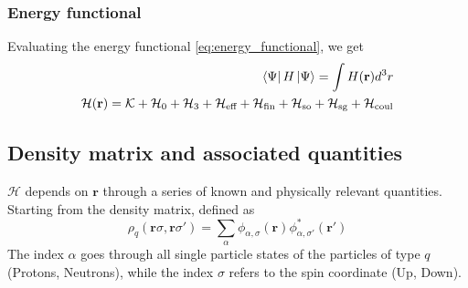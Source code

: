 \subsubsection{Energy functional}
Evaluating the energy functional \ref{eq:energy_functional}, we get
\begin{align}
    \bra{\Psi} H \ket{\Psi} = \int H(\mathbf{r}) d^3 r 
    \\\mathcal H(\mathbf{r}) = \mathcal{K} + \mathcal{H}_0 + \mathcal{H}_3 + \mathcal{H}_\text{eff}+\mathcal{H}_\text{fin}+\mathcal{H}_\text{so} + \mathcal{H}_\text{sg} + \mathcal{H}_\text{coul}
\end{align}
\subsection{Density matrix and associated quantities}
$\mathcal H$ depends on $\mathbf r$ through a series of known and physically relevant quantities.
\\Starting from the density matrix, defined as
\begin{equation}
    \rho_q (\mathbf r \sigma, \mathbf r \sigma') = \sum_{\alpha} \phi_{\alpha, \sigma} (\mathbf r )\phi_{\alpha, \sigma'}^*(\mathbf r')
\end{equation}
The index $\alpha$ goes through all single particle states of the particles of type $q$ (Protons, Neutrons), while the index $\sigma$ refers to the spin coordinate (Up, Down). 

